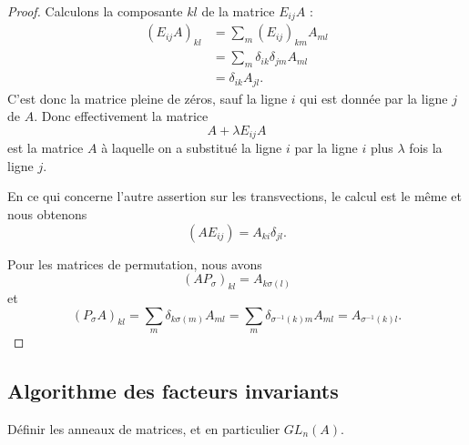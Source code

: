 \begin{proof}
    Calculons la composante \( kl\) de la matrice \( E_{ij}A\) :
    \begin{subequations}
        \begin{align}
            (E_{ij}A)_{kl}&=\sum_m(E_{ij})_{km}A_{ml}\\
            &=\sum_m\delta_{ik}\delta_{jm}A_{ml}\\
            &=\delta_{ik}A_{jl}.
        \end{align}
    \end{subequations}
    C'est donc la matrice pleine de zéros, sauf la ligne \( i\) qui est donnée par la ligne \( j\) de \( A\). Donc effectivement la matrice
    \begin{equation}
        A+\lambda E_{ij}A
    \end{equation}
    est la matrice \( A\) à laquelle on a substitué la ligne \( i\) par la ligne \( i\) plus \( \lambda\) fois la ligne \( j\).

    En ce qui concerne l'autre assertion sur les transvections, le calcul est le même et nous obtenons
    \begin{equation}
        (AE_{ij})=A_{ki}\delta_{jl}.
    \end{equation}

    Pour les matrices de permutation, nous avons 
    \begin{equation}
        (AP_{\sigma})_{kl}=A_{k\sigma(l)}
    \end{equation}
    et
    \begin{equation}
        (P_{\sigma}A)_{kl}=\sum_m\delta_{k\sigma(m)}A_{ml}=\sum_m\delta_{\sigma^{-1}(k)m}A_{ml}=A_{\sigma^{-1}(k)l}.
    \end{equation}
\end{proof}


\subsection{Algorithme des facteurs invariants}

\begin{probleme}
Définir les anneaux de matrices, et en particulier \(GL_n(A) \).
\end{probleme}

